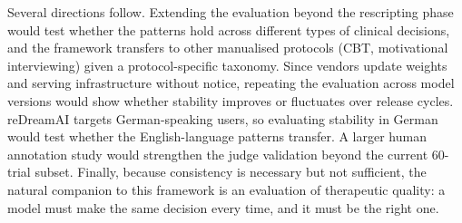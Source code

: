 Several directions follow. Extending the evaluation beyond the rescripting phase would test whether the patterns hold across different types of clinical decisions, and the framework transfers to other manualised protocols (CBT, motivational interviewing) given a protocol-specific taxonomy. Since vendors update weights and serving infrastructure without notice, repeating the evaluation across model versions would show whether stability improves or fluctuates over release cycles. reDreamAI targets German-speaking users, so evaluating stability in German would test whether the English-language patterns transfer. A larger human annotation study would strengthen the judge validation beyond the current 60-trial subset. Finally, because consistency is necessary but not sufficient, the natural companion to this framework is an evaluation of therapeutic quality: a model must make the same decision every time, and it must be the right one.
